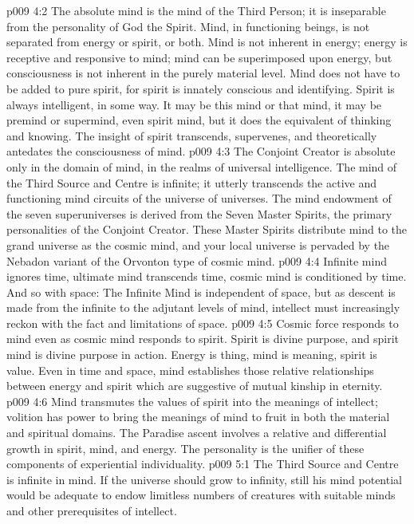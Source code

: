 \vs p009 4:2 The absolute mind is the mind of the Third Person; it is inseparable from the personality of God the Spirit. Mind, in functioning beings, is not separated from energy or spirit, or both. Mind is not inherent in energy; energy is receptive and responsive to mind; mind can be superimposed upon energy, but consciousness is not inherent in the purely material level. Mind does not have to be added to pure spirit, for spirit is innately conscious and identifying. Spirit is always intelligent,  in some way. It may be this mind or that mind, it may be premind or supermind, even spirit mind, but it does the equivalent of thinking and knowing. The insight of spirit transcends, supervenes, and theoretically antedates the consciousness of mind.
\vs p009 4:3 \pc The Conjoint Creator is absolute only in the domain of mind, in the realms of universal intelligence. The mind of the Third Source and Centre is infinite; it utterly transcends the active and functioning mind circuits of the universe of universes. The mind endowment of the seven superuniverses is derived from the Seven Master Spirits, the primary personalities of the Conjoint Creator. These Master Spirits distribute mind to the grand universe as the cosmic mind, and your local universe is pervaded by the Nebadon variant of the Orvonton type of cosmic mind.
\vs p009 4:4 Infinite mind ignores time, ultimate mind transcends time, cosmic mind is conditioned by time. And so with space: The Infinite Mind is independent of space, but as descent is made from the infinite to the adjutant levels of mind, intellect must increasingly reckon with the fact and limitations of space.
\vs p009 4:5 \pc Cosmic force responds to mind even as cosmic mind responds to spirit. Spirit is divine purpose, and spirit mind is divine purpose in action. Energy is thing, mind is meaning, spirit is value. Even in time and space, mind establishes those relative relationships between energy and spirit which are suggestive of mutual kinship in eternity.
\vs p009 4:6 Mind transmutes the values of spirit into the meanings of intellect; volition has power to bring the meanings of mind to fruit in both the material and spiritual domains. The Paradise ascent involves a relative and differential growth in spirit, mind, and energy. The personality is the unifier of these components of experiential individuality.
\vs p009 5:1 The Third Source and Centre is infinite in mind. If the universe should grow to infinity, still his mind potential would be adequate to endow limitless numbers of creatures with suitable minds and other prerequisites of intellect.
